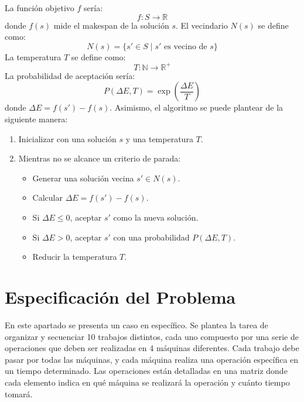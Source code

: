 \documentclass[11pt]{article}
\begin{document}
\vspace{1em} 
\noindent La función objetivo \( f \) sería:
    \[
    f: S \rightarrow \mathbb{R}
    \]
donde \( f(s) \) mide el makespan de la solución \( s \).
El vecindario \( N(s) \) se define como:
    \[
    N(s) = \{ s' \in S \mid s' \text{ es vecino de } s \}
    \]
La temperatura \( T \) se define como:   
    \[
    T: \mathbb{N} \rightarrow \mathbb{R}^+
    \]
La probabilidad de aceptación sería:
    \[
    P(\Delta E, T) = \exp\left(\frac{\Delta E}{T}\right)
    \]
    donde \( \Delta E = f(s') - f(s) \). Asimismo, el algoritmo se puede plantear de la siguiente manera:
    \begin{enumerate}
        \item Inicializar con una solución \( s \) y una temperatura \( T \).
        \item Mientras no se alcance un criterio de parada:
        \begin{itemize}
            \item Generar una solución vecina \( s' \in N(s) \).
            \item Calcular \( \Delta E = f(s') - f(s) \).
            \item Si \( \Delta E \leq 0 \), aceptar \( s' \) como la nueva solución.
            \item Si \( \Delta E > 0 \), aceptar \( s' \) con una probabilidad \( P(\Delta E, T) \).
            \item Reducir la temperatura \( T \).
        \end{itemize}
    \end{enumerate}

\section{Especificación del Problema}
En este apartado se presenta un caso en específico. Se plantea la tarea de organizar y secuenciar 10 trabajos distintos, cada uno compuesto por una serie de operaciones que deben ser realizadas en 4 máquinas diferentes. Cada trabajo debe pasar por todas las máquinas, y cada máquina realiza una operación específica en un tiempo determinado. Las operaciones están detalladas en una matriz donde cada elemento indica en qué máquina se realizará la operación y cuánto tiempo tomará. 
\end{document}
